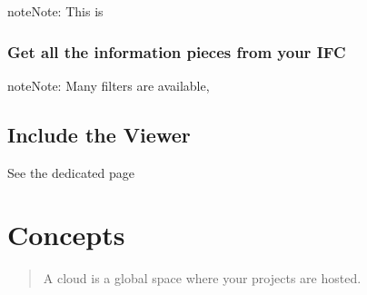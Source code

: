 \documentclass[a4paper,12pt,english]{sphinxmanual}
\begin{document}
\begin{sphinxadmonition}{note}{Note:}
This is 
\end{sphinxadmonition}


\subsection{Get all the information pieces from your IFC}
\label{\detokenize{tutorials/getting_started:get-all-the-information-pieces-from-your-ifc}}
%
\begin{sphinxVerbatim}[commandchars=\\\{\}]
  
    
\end{sphinxVerbatim}

\begin{sphinxadmonition}{note}{Note:}
Many filters are available, 
\end{sphinxadmonition}


\section{Include the Viewer}
\label{\detokenize{tutorials/getting_started:include-the-viewer}}
See the dedicated page 


\chapter{Concepts}
\label{\detokenize{concepts/index:concepts}}\label{\detokenize{concepts/index::doc}}
\begin{sphinxShadowBox}
\begin{quote}

A cloud is a global space where your projects are hosted.
\end{quote}
\end{sphinxShadowBox}
\end{document}
